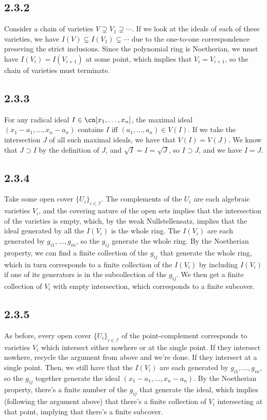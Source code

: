 \documentclass{article}
\begin{document}
\subsection*{2.3.2}
Consider a chain of varieties $V\supsetneq V_1\supsetneq\cdots$. If we look at the ideals of each of these varieties, we have $I(V)\subsetneq I(V_1)\subsetneq\cdots$ due to the one-to-one correspondence preseving the strict inclusions. Since the polynomial ring is Noetherian, we must have $I(V_i)=I(V_{i+1})$ at some point, which implies that $V_i=V_{i+1}$, so the chain of varieties must terminate.
\subsection*{2.3.3}
For any radical ideal $I\in\cn[x_1,\ldots,x_n]$, the maximal ideal $(x_1-a_1,\ldots,x_n-a_n)$ contains $I$ iff $(a_1,\ldots,a_n)\in V(I)$. If we take the intersection $J$ of all such maximal ideals, we have that $V(I)=V(J)$. We know that $J\supset I$ by the definition of $J$, and $\sqrt{I}=I=\sqrt{J}$, so $I\supset J$, and we have $I=J$.
\subsection*{2.3.4}
Take some open cover $\{U_i\}_{i\in\mathscr{I}}$. The complements of the $U_i$ are each algebraic varieties $V_i$, and the covering nature of the open sets implies that the intersection of the varieties is empty, which, by the weak Nullstellensatz, implies that the ideal generated by all the $I(V_i)$ is the whole ring. The $I(V_i)$ are each generated by $g_{i1},\ldots,g_{in}$, so the $g_{ij}$ generate the whole ring. By the Noetherian property, we can find a finite collection of the $g_{ij}$ that generate the whole ring, which in turn corresponds to a finite collection of the $I(V_i)$ by including $I(V_i)$ if one of its generators is in the subcollection of the $g_{ij}$. We then get a finite collection of $V_i$ with empty intersection, which corresponds to a finite subcover.
\subsection*{2.3.5}
As before, every open cover $\{U_i\}_{i\in\mathscr{I}}$ of the point-complement corresponds to varieties $V_i$ which intersect either nowhere or at the single point. If they intersect nowhere, recycle the argument from above and we're done. If they intersect at a single point. Then, we still have that the $I(V_i)$ are each generated by $g_{i1},\ldots,g_{in}$, so the $g_{ij}$ together generate the ideal $(x_1-a_1,\ldots,x_n-a_n)$. By the Noetherian property, there's a finite number of the $g_{ij}$ that generate the ideal, which implies (following the argument above) that there's a finite collection of $V_i$ intersecting at that point, implying that there's a finite subcover.
\end{document}
